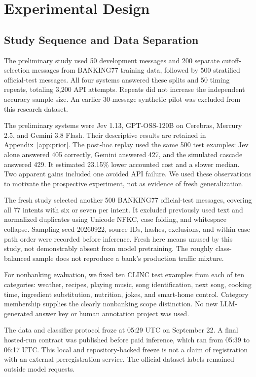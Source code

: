 \documentclass[conference]{IEEEtran}
\begin{document}
\section{Experimental Design}
\subsection{Study Sequence and Data Separation}
The preliminary study used 50 development messages and 200 separate cutoff-selection messages from BANKING77 training data, followed by 500 stratified official-test messages. All four systems answered these splits and 50 timing repeats, totaling 3,200 API attempts. Repeats did not increase the independent accuracy sample size. An earlier 30-message synthetic pilot was excluded from this research dataset.

The preliminary systems were Jev 1.13, GPT-OSS-120B on Cerebras, Mercury 2.5, and Gemini 3.8 Flash. Their descriptive results are retained in Appendix~\ref{app:prior}. The post-hoc replay used the same 500 test examples: Jev alone answered 405 correctly, Gemini answered 427, and the simulated cascade answered 429. It estimated 23.15\% lower accounted cost and a slower median. Two apparent gains included one avoided API failure. We used these observations to motivate the prospective experiment, not as evidence of fresh generalization.

The fresh study selected another 500 BANKING77 official-test messages, covering all 77 intents with six or seven per intent. It excluded previously used text and normalized duplicates using Unicode NFKC, case folding, and whitespace collapse. Sampling seed 20260922, source IDs, hashes, exclusions, and within-case path order were recorded before inference. Fresh here means unused by this study, not demonstrably absent from model pretraining. The roughly class-balanced sample does not reproduce a bank's production traffic mixture.

For nonbanking evaluation, we fixed ten CLINC test examples from each of ten categories: weather, recipes, playing music, song identification, next song, cooking time, ingredient substitution, nutrition, jokes, and smart-home control. Category membership supplies the clearly nonbanking scope distinction. No new LLM-generated answer key or human annotation project was used.

The data and classifier protocol froze at 05:29 UTC on September 22. A final hosted-run contract was published before paid inference, which ran from 05:39 to 06:17 UTC. This local and repository-backed freeze is not a claim of registration with an external preregistration service. The official dataset labels remained outside model requests.
\end{document}
